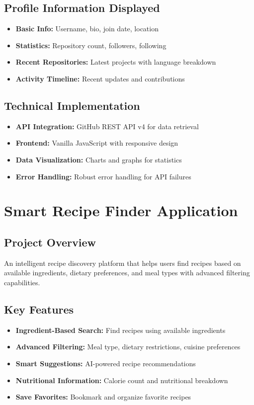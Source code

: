 \documentclass[11pt,a4paper]{article}
\begin{document}
\subsection{Profile Information Displayed}
\begin{itemize}[leftmargin=1.5cm]
\item \textbf{Basic Info:} Username, bio, join date, location
\item \textbf{Statistics:} Repository count, followers, following
\item \textbf{Recent Repositories:} Latest projects with language breakdown
\item \textbf{Activity Timeline:} Recent updates and contributions
\end{itemize}

\subsection{Technical Implementation}
\begin{itemize}[leftmargin=1.5cm]
\item \textbf{API Integration:} GitHub REST API v4 for data retrieval
\item \textbf{Frontend:} Vanilla JavaScript with responsive design
\item \textbf{Data Visualization:} Charts and graphs for statistics
\item \textbf{Error Handling:} Robust error handling for API failures
\end{itemize}

\newpage

\section{Smart Recipe Finder Application}

\subsection{Project Overview}
An intelligent recipe discovery platform that helps users find recipes based on available ingredients, dietary preferences, and meal types with advanced filtering capabilities.

\subsection{Key Features}
\begin{itemize}[leftmargin=1.5cm]
\item \textbf{Ingredient-Based Search:} Find recipes using available ingredients
\item \textbf{Advanced Filtering:} Meal type, dietary restrictions, cuisine preferences
\item \textbf{Smart Suggestions:} AI-powered recipe recommendations
\item \textbf{Nutritional Information:} Calorie count and nutritional breakdown
\item \textbf{Save Favorites:} Bookmark and organize favorite recipes
\end{itemize}
\end{document}
